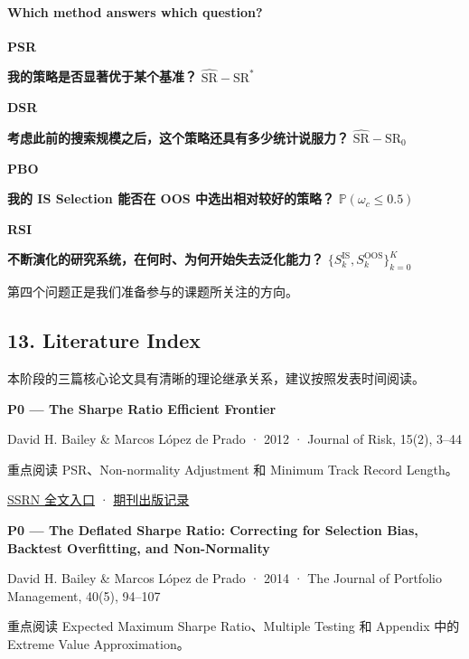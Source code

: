 \hypertarget{part-4-71-0001-which-method-answers-which-question}{%
\paragraph{Which method answers which question?}\label{part-4-71-0001-which-method-answers-which-question}}

\textbf{PSR}

\textbf{我的策略是否显著优于某个基准？} \(\widehat{\mathrm{SR}}-\mathrm{SR}^*\)

\textbf{DSR}

\textbf{考虑此前的搜索规模之后，这个策略还具有多少统计说服力？} \(\widehat{\mathrm{SR}}-\mathrm{SR}_0\)

\textbf{PBO}

\textbf{我的 IS Selection 能否在 OOS 中选出相对较好的策略？} \(\mathbb P(\omega_c\leq0.5)\)

\textbf{RSI}

\textbf{不断演化的研究系统，在何时、为何开始失去泛化能力？} \(\{S_k^{\mathrm{IS}},S_k^{\mathrm{OOS}}\}_{k=0}^{K}\)

第四个问题正是我们准备参与的课题所关注的方向。

\hypertarget{part-4-71-0001-literature-index}{%
\subsection{13. Literature Index}\label{part-4-71-0001-literature-index}}

本阶段的三篇核心论文具有清晰的理论继承关系，建议按照发表时间阅读。

\textbf{P0 --- The Sharpe Ratio Efficient Frontier}

David H. Bailey \& Marcos López de Prado · 2012 · Journal of Risk, 15(2), 3--44

重点阅读 PSR、Non-normality Adjustment 和 Minimum Track Record Length。

\href{https://papers.ssrn.com/sol3/papers.cfm?abstract_id=1821643}{SSRN 全文入口} · \href{https://www.risk.net/journal-of-risk/volume-15-number-2-december-2012}{期刊出版记录}

\textbf{P0 --- The Deflated Sharpe Ratio: Correcting for Selection Bias, Backtest Overfitting, and Non-Normality}

David H. Bailey \& Marcos López de Prado · 2014 · The Journal of Portfolio Management, 40(5), 94--107

重点阅读 Expected Maximum Sharpe Ratio、Multiple Testing 和 Appendix 中的 Extreme Value Approximation。

